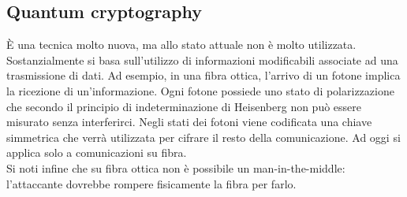 \subsection{Quantum cryptography}
È una tecnica molto nuova, ma allo stato attuale non è molto utilizzata. Sostanzialmente si basa sull'utilizzo di informazioni modificabili associate ad una trasmissione di dati. Ad esempio, in una fibra ottica, l'arrivo di un fotone implica la ricezione di un'informazione. Ogni fotone possiede uno stato di polarizzazione che secondo il principio di indeterminazione di Heisenberg non può essere misurato senza interferirci. Negli stati dei fotoni viene codificata una chiave simmetrica che verrà utilizzata per cifrare il resto della comunicazione. Ad oggi si applica solo a comunicazioni su fibra.\\
Si noti infine che su fibra ottica non è possibile un man-in-the-middle: l'attaccante dovrebbe rompere fisicamente la fibra per farlo.

